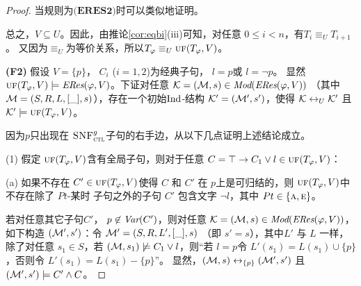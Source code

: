 \begin{proof}
	当规则为$\textbf{(ERES2)}$时可以类似地证明。
	
	总之，$V\subseteq U$。因此，由推论\ref{cor:eqbi}(iii)可知，对任意 $0 \leq i < n$，有$T_i \equiv_U T_{i+1}$。
	又因为$\equiv_U$为等价关系，所以$T_{\varphi} \equiv_U \textsc{uf}(T_\varphi,V)$。
	
	
	
	\textbf{(F2)} 假设 $V=\{p\}$， $C_i$ ($i=1,2$)为经典子句，  $l = p$或 $l = \neg p$。
	显然 $\textsc{uf}(T_\varphi,V) \models \emph{ERes}(\varphi,V)$。下证对任意 ${\cal K}=({\cal M}, s)\in \textit{Mod}(\emph{ERes}(\varphi,V))$ （其中${\cal M}=(S, R, L, [\_], s)$），存在一个初始$\textrm{Ind}$-结构 ${\cal K}'=({\cal M}', s')$，使得 ${\cal K} \leftrightarrow_{U} {\cal K}'$ 且 ${\cal K}' \models \textsc{uf}(T_\varphi,V)$。
	
	
	因为$p$只出现在 ${\textsc{SNF}_{\textsc{ctl}}^g}$子句的右手边，从以下几点证明上述结论成立。
	
	(1) 假定 $\textsc{uf}(T_\varphi,V)$含有全局子句，则对于任意 $C=\top\rightarrow C_1 \vee l \in \textsc{uf}(T_\varphi,V)$：
	
	(a) 如果不存在 $C'\in \textsc{uf}(T_\varphi,V)$使得 $C$ 和 $C'$ 在 $p$上是可归结的，则 $\textsc{uf}(T_\varphi,V)$中不存在除了 $Pt$-某时 子句之外的子句 $C'$ 包含文字 $\neg l$，其中 $Pt\in \{\textsc{a}, \textsc{e}\}$。
	
	若对任意其它子句$C'$， $p\not \in \textit{Var}(C')$，则对任意 ${\cal K}=({\cal M}, s)\in \textit{Mod}(\emph{ERes}(\varphi,V))$，如下构造 $({\cal M}',s')$：令 ${\cal M}'= (S, R, L',[\_], s)$ （即 $s'=s$），其中$L'$ 与 $L$ 一样，除了对任意 $s_1\in S$，若 $({\cal M}, s_1) \not \models C_1 \vee l$，则“若 $l=p$令 $L'(s_1) = L(s_1) \cup \{p\}$，否则令 $L'(s_1) = L(s_1) - \{p\}$”。
	显然，$({\cal M}, s) \leftrightarrow_{\{p\}} ({\cal M}', s')$ 且$({\cal M}', s') \models C' \wedge C$。
	

\end{proof}

